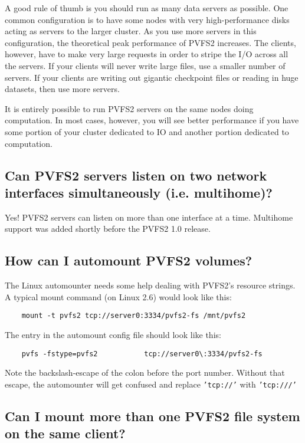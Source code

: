 \documentclass[11pt,letterpaper]{article}
\begin{document}
A good rule of thumb is you should run as many data servers as possible.
One common configuration is to have some nodes with very
high-performance disks acting as servers to the larger cluster.  As you
use more servers in this configuration, the theoretical peak performance
of PVFS2 increases.  The clients, however, have to make very large
requests in order to stripe the I/O across all the servers.  If your
clients will never write large files, use a smaller number of servers.
If your clients are writing out gigantic checkpoint files or reading in
huge datasets, then use more servers.

It is entirely possible to run PVFS2 servers on the same nodes doing
computation. In most cases, however, you will see better performance
if you have some portion of your cluster dedicated to IO and another
portion dedicated to computation.


\subsection{Can PVFS2 servers listen on two network interfaces simultaneously (i.e. multihome)?}

Yes!  PVFS2 servers can listen on more than one interface at a time.
Multihome support was added shortly before the PVFS2 1.0 release.

\subsection{How can I automount PVFS2 volumes?}

The Linux automounter needs some help dealing with PVFS2's resource
strings.  A typical mount command (on Linux 2.6) would look like this:

\begin{verbatim}
	mount -t pvfs2 tcp://server0:3334/pvfs2-fs /mnt/pvfs2
\end{verbatim}

The entry in the automount config file should look like this:

\begin{verbatim}
	pvfs -fstype=pvfs2           tcp://server0\:3334/pvfs2-fs
\end{verbatim}

Note the backslash-escape of the colon before the port number.  Without that
escape, the automounter will get confused and replace \texttt{'tcp://'} with
\texttt{'tcp:///'}

\subsection{Can I mount more than one PVFS2 file system on the same client?}
\label{sec:multiple-mounts}
\end{document}
